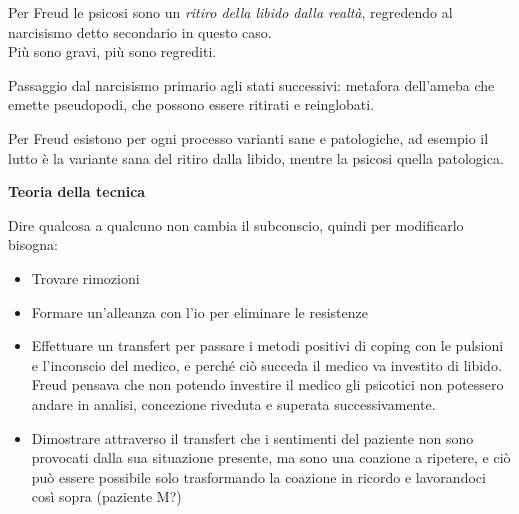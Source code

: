 \documentclass[
]{article}
\providecommand{\tightlist}{%
  \setlength{\itemsep}{0pt}\setlength{\parskip}{0pt}}
\begin{document}
Per Freud le psicosi sono un \emph{ritiro della libido dalla realtà},
regredendo al narcisismo detto secondario in questo caso.\\
Più sono gravi, più sono regrediti.

Passaggio dal narcisismo primario agli stati successivi: metafora
dell'ameba che emette pseudopodi, che possono essere ritirati e
reinglobati.

Per Freud esistono per ogni processo varianti sane e patologiche, ad
esempio il lutto è la variante sana del ritiro dalla libido, mentre la
psicosi quella patologica.

\textbf{Teoria della tecnica}

Dire qualcosa a qualcuno non cambia il subconscio, quindi per
modificarlo bisogna:

\begin{itemize}
\tightlist
\item
  Trovare rimozioni
\item
  Formare un'alleanza con l'io per eliminare le resistenze
\item
  Effettuare un transfert per passare i metodi positivi di coping con le
  pulsioni e l'inconscio del medico, e perché ciò succeda il medico va
  investito di libido.\\
  Freud pensava che non potendo investire il medico gli psicotici non
  potessero andare in analisi, concezione riveduta e superata
  successivamente.
\item
  Dimostrare attraverso il transfert che i sentimenti del paziente non
  sono provocati dalla sua situazione presente, ma sono una coazione a
  ripetere, e ciò può essere possibile solo trasformando la coazione in
  ricordo e lavorandoci così sopra (paziente M?)
\end{itemize}
\end{document}
